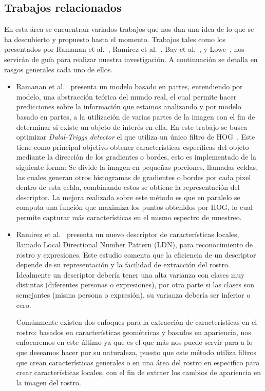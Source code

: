 \documentclass{udparticle}
\begin{document}
\subsection{Trabajos relacionados}
En esta área se encuentran variados trabajos que nos dan una idea de lo que se ha descubierto y propuesto hasta el momento. Trabajos tales como los presentados por Ramanan et al.~\cite{oddt}, Ramirez et al.~\cite{ldnp}, Bay et al.~\cite{surf}, y Lowe~\cite{sift}, nos servirán de guía para realizar nuestra investigación. A continuación se detalla en rasgos generales cada uno de ellos.
\begin{itemize}
  \item Ramanan et al.~\cite{oddt} presenta un modelo basado en partes, entendiendo por modelo, una abstracción teórica del mundo real, el cual permite hacer predicciones sobre la información que estamos analizando y por modelo basado en partes, a la utilización de varias partes de la imagen con el fin de determinar si existe un objeto de interés en ella. En este trabajo se busca optimizar \textit{Dalal-Triggs detector} el que utiliza un único filtro de HOG~\cite{hog}. Este tiene como principal objetivo obtener características específicas del objeto mediante la dirección de los gradientes o bordes, esto es implementado de la siguiente forma: Se divide la imagen en pequeñas porciones, llamadas celdas, las cuales generan otros histogramas de gradientes o bordes por cada pixel dentro de esta celda, combinando estos se obtiene la representación del descriptor. La mejora realizada sobre este método es que en paralelo se computa una función que maximiza los puntos obtenidos por HOG, lo cual permite capturar más características en el mismo espectro de muestreo.

  \item Ramirez et al.~\cite{ldnp} presenta un nuevo descriptor de características locales, llamado Local Directional Number Pattern (LDN), para reconocimiento de rostro y expresiones. Este estudio comenta que la eficiencia de un descriptor depende de su representación y la facilidad de extracción del rostro. Idealmente un descriptor debería tener una alta varianza con clases muy distintas (diferentes personas o expresiones), por otra parte si las clases son semejantes (misma persona o expresión), su varianza debería ser inferior o cero. 

Comúnmente existen dos enfoques para la extracción de características en el rostro: basados en características geométricas y basados en apariencia, nos enfocaremos en este último ya que es el que más nos puede servir para a lo que deseamos hacer por su naturaleza, puesto que este método utiliza filtros que crean características generales o en una área del rostro en especifico para crear características locales, con el fin de extraer los cambios de apariencia en la imagen del rostro.


\end{itemize}
\end{document}
